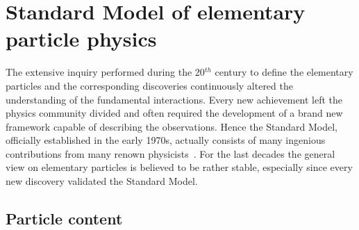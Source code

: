 \section{Standard Model of elementary particle physics} \label{sec::SM}
The extensive inquiry performed during the 20$^{th}$ century to define the elementary particles and the corresponding discoveries continuously altered the understanding of the fundamental interactions.
Every new achievement left the physics community divided and often required the development of a brand new framework capable of describing the observations.
Hence the Standard Model, officially established in the early 1970s, actually consists of many ingenious contributions from many renown physicists~\cite{MandlAndShaw, PeskinAndSchroeder, Paschos:2007pi}. 
For the last decades the general view on elementary particles is believed to be rather stable, especially since every new discovery validated the Standard Model.

\subsection{Particle content}

